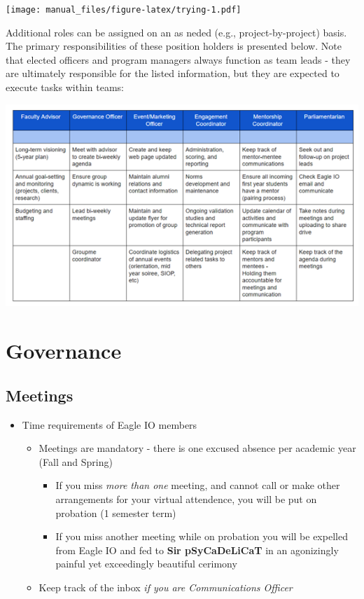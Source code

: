 \documentclass[
]{book}
\providecommand{\tightlist}{%
  \setlength{\itemsep}{0pt}\setlength{\parskip}{0pt}}
\begin{document}
\texttt{[image: manual\_files/figure-latex/trying-1.pdf]}

Additional roles can be assigned on an as neded (e.g., project-by-project) basis. The primary responsibilities of these position holders is presented below. Note that elected officers and program managers always function as team leads - they are ultimately responsible for the listed information, but they are expected to execute tasks within teams:

\includegraphics{images/eagleioroles.PNG}

\hypertarget{governance}{%
\chapter{Governance}\label{governance}}

\hypertarget{meetings}{%
\section{Meetings}\label{meetings}}

\begin{itemize}
\tightlist
\item
  Time requirements of Eagle IO members

  \begin{itemize}
  \tightlist
  \item
    Meetings are mandatory - there is one excused absence per academic year (Fall and Spring)

    \begin{itemize}
    \tightlist
    \item
      If you miss \emph{more than one} meeting, and cannot call or make other arrangements for your virtual attendence, you will be put on probation (1 semester term)
    \item
      If you miss another meeting while on probation you will be expelled from Eagle IO and fed to \textbf{Sir pSyCaDeLiCaT} in an agonizingly painful yet exceedingly beautiful cerimony
    \end{itemize}
  \item
    Keep track of the inbox \emph{if you are Communications Officer}
  \end{itemize}
\end{itemize}
\end{document}
